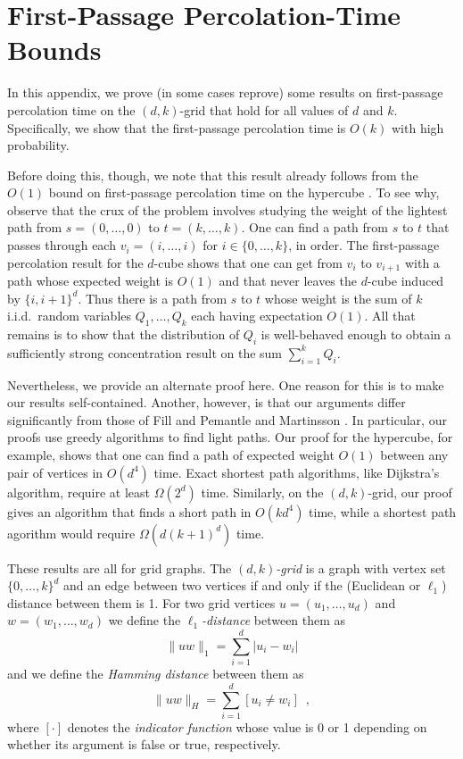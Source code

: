 \documentclass[lotsofwhite]{patmorin}
\begin{document}



\appendix
\section{First-Passage Percolation-Time Bounds}

In this appendix, we prove (in some cases reprove) some results on
first-passage percolation time on the $(d,k)$-grid that hold for
all values of $d$ and $k$.  Specifically, we show that the first-passage
percolation time is $O(k)$ with high probability.

Before doing this, though, we note that this result already follows from
the $O(1)$ bound on first-passage percolation time on the hypercube
\cite{fill.pemantle:percolation, martinsson:unoriented}.  To see why,
observe that the crux of the problem involves studying the weight of
the lightest path from $s=(0,\ldots,0)$ to $t=(k,\ldots,k)$. One can
find a path from $s$ to $t$ that passes through each $v_i=(i,\ldots,i)$
for $i\in\{0,\ldots,k\}$, in order.  The first-passage percolation
result for the $d$-cube shows that one can get from $v_i$ to $v_{i+1}$
with a path whose expected weight is $O(1)$ and that never leaves the
$d$-cube induced by $\{i,i+1\}^d$.  Thus there is a path from $s$ to $t$
whose weight is the sum of $k$ i.i.d.\ random variables $Q_1,\ldots,Q_k$
each having expectation $O(1)$. All that remains is to show that the
distribution of $Q_i$ is well-behaved enough to obtain a sufficiently
strong concentration result on the sum $\sum_{i=1}^k Q_i$.

Nevertheless, we provide an alternate proof here.  One reason for this
is to make our results self-contained.  Another, however, is that
our arguments differ significantly from those of Fill and Pemantle
\cite{fill.pemantle:percolation} and Martinsson \cite{martinsson:unoriented}.
In particular, our proofs use greedy algorithms to find light paths.
Our proof for the hypercube, for example, shows that one can find a path
of expected weight $O(1)$ between any pair of vertices in $O(d^4)$ time.
Exact shortest path algorithms, like Dijkstra's algorithm, require at
least $\Omega(2^d)$ time.  Similarly, on the $(d,k)$-grid, our proof
gives an algorithm that finds a short path in $O(kd^4)$ time, while a
shortest path agorithm would require $\Omega(d(k+1)^d)$ time.

These results are all for grid graphs.  The \emph{$(d,k)$-grid} is a graph
with
vertex set $\{0,\ldots,k\}^d$ and an edge between two vertices if
and only if the (Euclidean or $\ell_1$) distance between them is 1.
For two grid vertices $u=(u_1,\ldots,u_d)$ and $w=(w_1,\ldots,w_d)$
we define the \emph{$\ell_1$-distance} between them as
\[
   \|uw\|_1 = \sum_{i=1}^d |u_i-w_i|
\]
and we define the \emph{Hamming distance} between them as
\[
   \|uw\|_H = \sum_{i=1}^d [u_i\neq w_i] \enspace ,
\]
where $[\cdot]$ denotes the \emph{indicator function} whose value is 0
or 1 depending on whether its argument is false or true, respectively.
\end{document}
